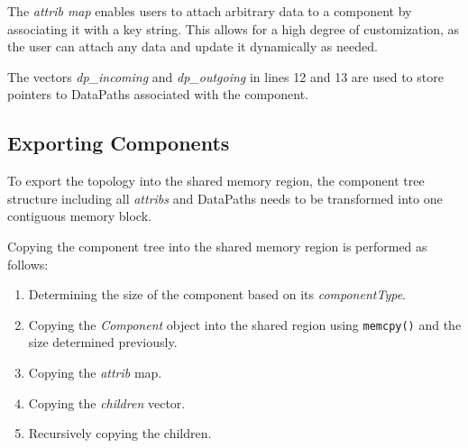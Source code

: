 The \emph{attrib map} enables users to attach arbitrary data to a component by associating it with a key string. This allows for a high degree of customization,
as the user can attach any data and update it dynamically as needed.

The vectors \emph{dp\_incoming} and \emph{dp\_outgoing} in lines 12 and 13 are used to store pointers to DataPaths associated with the component.

\subsection{Exporting Components}\label{subsection:export_components}
To export the topology into the shared memory region, the component tree structure including all \emph{attribs} and DataPaths needs to be transformed into one contiguous memory block.

Copying the component tree into the shared memory region is performed as follows:
\begin{enumerate}
    \item Determining the size of the component based on its \emph{componentType}.
    \item Copying the \emph{Component} object into the shared region using \lstinline{memcpy()} and the size determined previously.
    \item Copying the \emph{attrib} map.
    \item Copying the \emph{children} vector.
    \item Recursively copying the children.
\end{enumerate}

